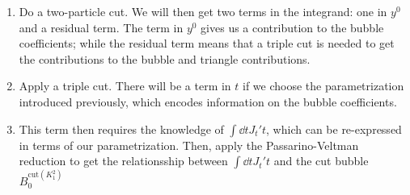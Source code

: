 \begin{enumerate}
\item Do a two-particle cut. We will then get two terms in the integrand: one in $y^0$ and a residual term. The term in $y^0$ gives us a contribution to the bubble coefficients; while the residual term means that a triple cut is needed to get the contributions to the bubble and triangle contributions.
%
\item Apply a triple cut. There will be a term in $t$ if we choose the parametrization introduced previously, which encodes information on the bubble coefficients.
%
\item This term then requires the knowledge of $\int \dd t J_t' t$, which can be re-expressed in terms of our parametrization. Then, apply the Passarino-Veltman reduction to get the relationsship between $\int \dd tJ_t' t$ and the cut bubble $B_0^{\mathrm{cut}(K_1^2)}$
\end{enumerate}
\fi
%
%
%
